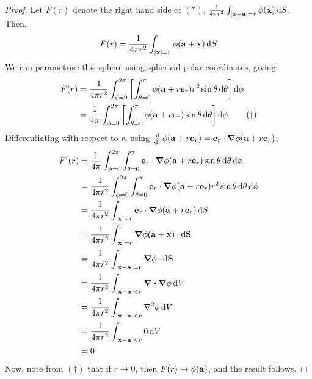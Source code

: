 \begin{proof}
	Let \(F(r)\) denote the right hand side of \((\ast)\), \(\frac{1}{4 \pi r^2} \int_{\abs{\vb x - \vb a} = r} \phi(\vb x) \dd{S}\). Then,
	\[ F(r) = \frac{1}{4\pi r^2} \int_{\abs{\vb x} = r} \phi(\vb a + \vb x) \dd{S} \]
	We can parametrise this sphere using spherical polar coordinates, giving
	\begin{align}
		F(r) & = \frac{1}{4\pi r^2} \int_{\phi = 0}^{2 \pi} \left[ \int_{\theta = 0}^\pi \phi(\vb a + r\vb e_r) r^2 \sin \theta \dd{\theta} \right] \dd{\phi} \notag  \\
		     & = \frac{1}{4\pi} \int_{\phi = 0}^{2 \pi} \left[ \int_{\theta = 0}^\pi \phi(\vb a + r\vb e_r) \sin \theta \dd{\theta} \right] \dd{\phi} \tag{\(\dagger\)}
	\end{align}
	Differentiating with respect to \(r\), using \(\dv{r}\phi(\vb a + r \vb e_r) = \vb e_r \cdot \grad\phi(\vb a + r \vb e_r)\),
	\begin{align*}
		F'(r) & = \frac{1}{4\pi} \int_{\phi = 0}^{2 \pi} \int_{\theta = 0}^\pi \vb e_r \cdot \grad\phi(\vb a + r\vb e_r) \sin \theta \dd{\theta} \dd{\phi}         \\
		      & = \frac{1}{4\pi r^2} \int_{\phi = 0}^{2 \pi} \int_{\theta = 0}^\pi \vb e_r \cdot \grad\phi(\vb a + r\vb e_r) r^2 \sin \theta \dd{\theta} \dd{\phi} \\
		      & = \frac{1}{4\pi r^2} \int_{\abs{\vb x} = r} \vb e_r \cdot \grad\phi(\vb a + r\vb e_r) \dd{S}                                                       \\
		      & = \frac{1}{4\pi r^2} \int_{\abs{\vb x} = r} \grad\phi(\vb a + \vb x) \cdot \dd{\vb S}                                                              \\
		      & = \frac{1}{4\pi r^2} \int_{\abs{\vb x - \vb a} = r} \grad\phi \cdot \dd{\vb S}                                                                     \\
		      & = \frac{1}{4\pi r^2} \int_{\abs{\vb x - \vb a} < r} \div{\grad\phi} \dd{V}                                                                         \\
		      & = \frac{1}{4\pi r^2} \int_{\abs{\vb x - \vb a} < r} \laplacian{\phi} \dd{V}                                                                        \\
		      & = \frac{1}{4\pi r^2} \int_{\abs{\vb x - \vb a} < r} 0 \dd{V}                                                                                       \\
		      & = 0
	\end{align*}
	Now, note from \((\dagger)\) that if \(r \to 0\), then \(F(r) \to \phi(\vb a)\), and the result follows.
\end{proof}


